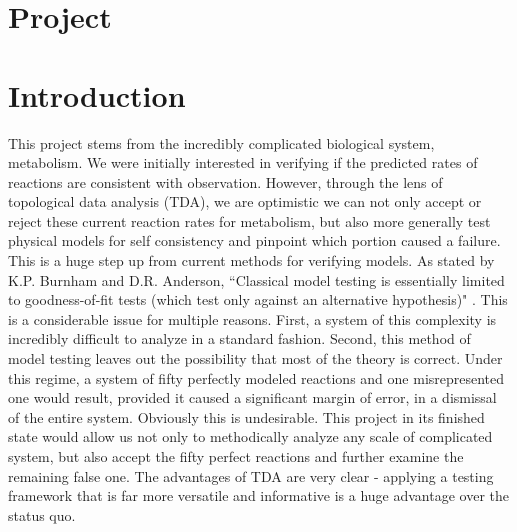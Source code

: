 \documentclass[12pt]{article}
\begin{document}
\maketitle
\section*{Project}


\section{Introduction}

This project stems from the incredibly complicated biological system, metabolism. We were initially interested in verifying if the predicted rates of reactions are consistent with observation. However, through the lens of topological data analysis (TDA), we are optimistic we can not only accept or reject these current reaction rates for metabolism, but also more generally test physical models for self consistency and pinpoint which portion caused a failure. This is a huge step up from current methods for verifying models. As stated by K.P. Burnham and D.R. Anderson, ``Classical model testing is essentially limited to goodness-of-fit tests (which test only against an alternative hypothesis)" \cite{intro}. This is a considerable issue for multiple reasons. First, a system of this complexity is incredibly difficult to analyze in a standard fashion. Second, this method of model testing leaves out the possibility that most of the theory is correct. Under this regime, a system of fifty perfectly modeled reactions and one misrepresented one would result, provided it caused a significant margin of error, in a dismissal of the entire system. Obviously this is undesirable. This project in its finished state would allow us not only to methodically analyze any scale of complicated system, but also accept the fifty perfect reactions and further examine the remaining false one. The advantages of TDA are very clear - applying a testing framework that is far more versatile and informative is a huge advantage over the status quo.
\end{document}
